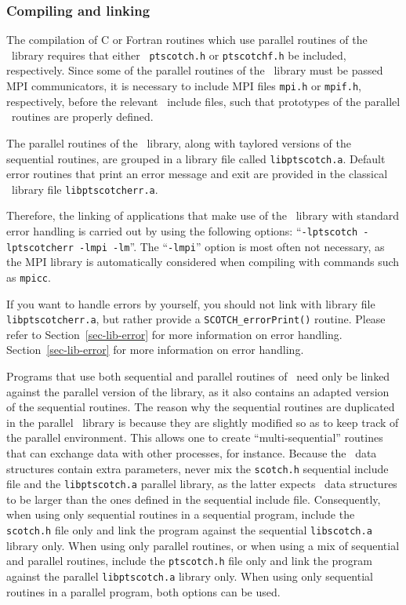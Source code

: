 \subsubsection{Compiling and linking}

The compilation of C or Fortran routines which use parallel
routines of the \libscotch\ library requires that either {\tt
ptscotch.h} or {\tt ptscotchf.h} be included, respectively. Since some
of the parallel routines of the \libscotch\ library must be passed MPI
communicators, it is necessary to include MPI files {\tt mpi.h} or
{\tt mpif.h}, respectively, before the relevant \ptscotch\ include
files, such that prototypes of the parallel \libscotch\ routines are
properly defined.

The parallel routines of the \libscotch\ library, along with
taylored versions of the sequential routines, are grouped in a
library file called {\tt libptscotch.a}. Default error routines that
print an error message and exit are provided in the classical
\scotch\ library file {\tt libptscotcherr.a}.

Therefore, the linking of applications that make use of the
\libscotch\ library with standard error handling is carried out by
using the following options: ``{\tt -lptscotch -lptscotcherr -lmpi -lm}''.
The ``{\tt -lmpi}'' option is most often not necessary, as the MPI
library is automatically considered when compiling with commands such
as {\tt mpicc}.

If you want to handle errors by yourself, you should not link with
library file {\tt libptscotcherr.a}, but rather provide a
{\tt SCOTCH\_\lbt error\lbt Print()} routine. Please refer to
Section~\ref{sec-lib-error} for more information on error handling.
Section~\ref{sec-lib-error} for more information on error handling.

Programs that use both sequential and parallel routines of
\scotch\ need only be linked against the parallel version of the
library, as it also contains an adapted version of the sequential
routines. The reason why the sequential routines are duplicated in the
parallel \ptscotch\ library is because they are slightly modified so
as to keep track of the parallel environment. This allows one to
create ``multi-sequential'' routines that can exchange data with other
processes, for instance. Because the \libscotch\ data structures
contain extra parameters, never mix the \texttt{scotch.h} sequential
include file and the \texttt{libptscotch.a} parallel library, as the
latter expects \scotch\ data structures to be larger than the ones
defined in the sequential include file. Consequently, when using only
sequential routines in a sequential program, include the
\texttt{scotch.h} file only and link the program against the sequential
\texttt{libscotch.a} library only. When using only parallel routines,
or when using a mix of sequential and parallel routines, include the
\texttt{ptscotch.h} file only and link the program against the parallel
\texttt{libptscotch.a} library only. When using only sequential
routines in a parallel program, both options can be used.

